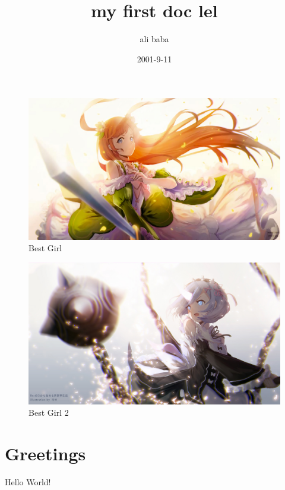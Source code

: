 \documentclass{article}
\title{my first doc lel}
\date{2001-9-11}
\author{ali baba}
\begin{document}
  	\maketitle
  	\newpage
  	

	\begin{appendix}
	  \listoffigures
	  \listoftables
	\end{appendix}

	\clearpage
	
	\begin{figure}
  		\includegraphics[width=\linewidth]{VanAstrea.jpg}
  		\caption{Best Girl}
  		\label{fig:boat1}
	\end{figure}
	
	\clearpage
	
	\begin{figure}
  		\includegraphics[width=\linewidth]{Rem.jpg}
  		\caption{Best Girl 2}
  		\label{fig:boat1}
	\end{figure}
	
	\clearpage
	

	\section{Greetings}
	Hello World!
	
\end{document}
